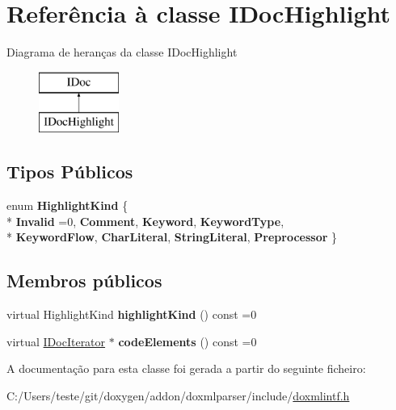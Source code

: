 \hypertarget{class_i_doc_highlight}{\section{Referência à classe I\-Doc\-Highlight}
\label{class_i_doc_highlight}
}
Diagrama de heranças da classe I\-Doc\-Highlight\begin{figure}[H]
\begin{center}
\leavevmode
\includegraphics[height=2.000000cm]{class_i_doc_highlight}
\end{center}
\end{figure}
\subsection*{Tipos Públicos}
\begin{DoxyCompactItemize}
\item 
enum {\bfseries Highlight\-Kind} \{ \\*
{\bfseries Invalid} =0, 
{\bfseries Comment}, 
{\bfseries Keyword}, 
{\bfseries Keyword\-Type}, 
\\*
{\bfseries Keyword\-Flow}, 
{\bfseries Char\-Literal}, 
{\bfseries String\-Literal}, 
{\bfseries Preprocessor}
 \}
\end{DoxyCompactItemize}
\subsection*{Membros públicos}
\begin{DoxyCompactItemize}
\item 
\hypertarget{class_i_doc_highlight_afbba17891d4bc718da7751c68145c452}{virtual Highlight\-Kind {\bfseries highlight\-Kind} () const =0}\label{class_i_doc_highlight_afbba17891d4bc718da7751c68145c452}

\item 
\hypertarget{class_i_doc_highlight_a94e4f28936edc9131e98d0d12dd89ae1}{virtual \hyperlink{class_i_doc_iterator}{I\-Doc\-Iterator} $\ast$ {\bfseries code\-Elements} () const =0}\label{class_i_doc_highlight_a94e4f28936edc9131e98d0d12dd89ae1}

\end{DoxyCompactItemize}


A documentação para esta classe foi gerada a partir do seguinte ficheiro\-:\begin{DoxyCompactItemize}
\item 
C\-:/\-Users/teste/git/doxygen/addon/doxmlparser/include/\hyperlink{include_2doxmlintf_8h}{doxmlintf.\-h}\end{DoxyCompactItemize}
